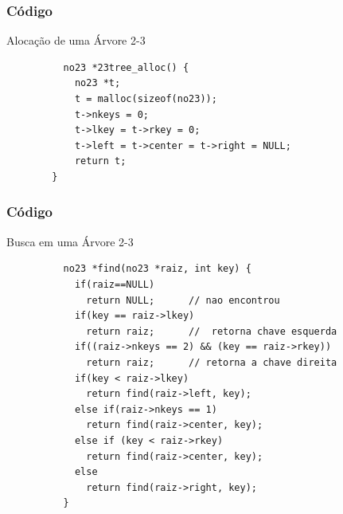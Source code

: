 \documentclass[cyan,compress,aspectratio=43]{beamer}
\begin{document}
\begin{frame}[fragile]
\frametitle{Código}
      \vspace{-0.3cm}
	\begin{block}{Alocação de uma Árvore 2-3}
		\begin{lstlisting}
		  no23 *23tree_alloc() {
		    no23 *t;
		    t = malloc(sizeof(no23));
		    t->nkeys = 0;
		    t->lkey = t->rkey = 0;
		    t->left = t->center = t->right = NULL;
		    return t;
		}
		\end{lstlisting}

  	\end{block}
\end{frame}
\begin{frame}[fragile]
\frametitle{Código}
      \vspace{-0.3cm}
	\begin{block}{Busca em uma Árvore 2-3}
		\begin{lstlisting}
		  no23 *find(no23 *raiz, int key) {
		    if(raiz==NULL)
		      return NULL;      // nao encontrou
		    if(key == raiz->lkey)
		      return raiz;      //  retorna chave esquerda
		    if((raiz->nkeys == 2) && (key == raiz->rkey))
		      return raiz;      // retorna a chave direita
		    if(key < raiz->lkey)
		      return find(raiz->left, key);
		    else if(raiz->nkeys == 1)
		      return find(raiz->center, key);
		    else if (key < raiz->rkey)
		      return find(raiz->center, key);
		    else
		      return find(raiz->right, key);
		  }
		\end{lstlisting}

  	\end{block}
\end{frame}
\end{document}
